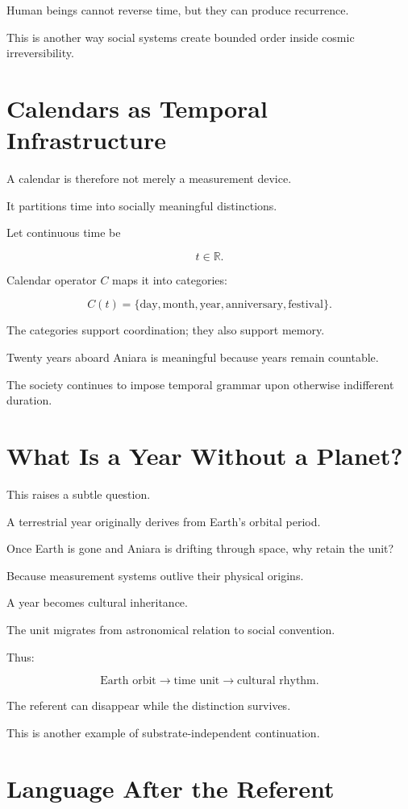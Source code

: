 \documentclass[11pt,oneside]{book}
\theoremstyle{definition}
\theoremstyle{remark}
\begin{document}
Human beings cannot reverse time, but they can produce recurrence.

This is another way social systems create bounded order inside cosmic irreversibility.

\section{Calendars as Temporal Infrastructure}

A calendar is therefore not merely a measurement device.

It partitions time into socially meaningful distinctions.

Let continuous time be

\[
t\in\mathbb R.
\]

Calendar operator \(C\) maps it into categories:

\[
C(t)
=
\{
\text{day},
\text{month},
\text{year},
\text{anniversary},
\text{festival}
\}.
\]

The categories support coordination; they also support memory.

Twenty years aboard Aniara is meaningful because years remain countable.

The society continues to impose temporal grammar upon otherwise indifferent duration.

\section{What Is a Year Without a Planet?}

This raises a subtle question.

A terrestrial year originally derives from Earth's orbital period.

Once Earth is gone and Aniara is drifting through space, why retain the unit?

Because measurement systems outlive their physical origins.

A year becomes cultural inheritance.

The unit migrates from astronomical relation to social convention.

Thus:

\[
\text{Earth orbit}
\rightarrow
\text{time unit}
\rightarrow
\text{cultural rhythm}.
\]

The referent can disappear while the distinction survives.

This is another example of substrate-independent continuation.

\section{Language After the Referent}
\end{document}
